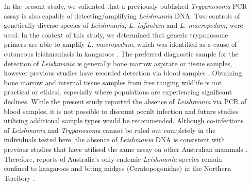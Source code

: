 \documentclass[a4paper, nobind]{templates/ociamthesis}
\begin{document}
In the present study, we validated that a previously published \emph{Trypanosoma} PCR assay \autocite{mcinnesTrypanosomaIrwiniSp2009} is also capable of detecting/amplifying \emph{Leishmania} DNA. Two controls of genetically diverse species of \emph{Leishmania}, \emph{L. infantum} and \emph{L. macropodum}, \autocite{barrattIsolationNovelTrypanosomatid2017} were used. In the context of this study, we determined that generic trypanosome primers are able to amplify \emph{L. macropodum}, which was identified as a cause of cutaneous leishmaniasis in kangaroos \autocite{roseCutaneousLeishmaniasisRed2004}. The preferred diagnostic sample for the detection of \emph{Leishmania} is generally bone marrow aspirate or tissue samples, however previous studies have recorded detection via blood samples \autocite{humbergLeishmaniaChagasiOpossums2012,medkourCanineVectorborneProtozoa2020}. Obtaining bone marrow and internal tissue samples from free ranging wildlife is not practical or ethical, especially where populations are experiencing significant declines. While the present study reported the absence of \emph{Leishmania} via PCR of blood samples, it is not possible to discount occult infection and future studies utilising additional sample types would be recommended. Although co-infections of \emph{Leishmania} and \emph{Trypanosoma} cannot be ruled out completely in the individuals tested here, the absence of \emph{Leishmania} DNA is consistent with previous studies that have utilised the same assay on other Australian mammals \autocite{papariniIdentificationNovelTrypanosome2011,austenInvestigationMorphologicalDiversity2015,barbosaSequenceAnalysesMitochondrial2019}. Therefore, reports of Australia's only endemic \emph{Leishmania} species remain confined to kangaroos and biting midges (Ceratopogonidae) in the Northern Territory \autocite{roseCutaneousLeishmaniasisRed2004,dougallNewReportsAustralian2009,dougallEvidenceIncriminatingMidges2011}.
\end{document}
